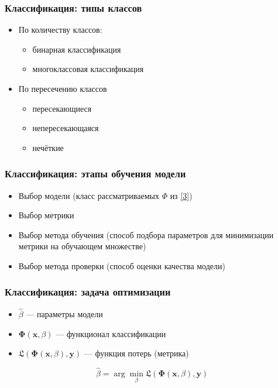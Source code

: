 \documentclass[11pt]{beamer}
\begin{document}
	\begin{frame}
		\frametitle{Классификация: типы классов}
		\begin{itemize}
			\item По количеству классов:
			\begin{itemize}
				\item бинарная классификация
				\item многоклассовая классификация
			\end{itemize}
			\item По пересечению классов 
			\begin{itemize}
				\item пересекающиеся
				\item непересекающаяся
				\item нечёткие
			\end{itemize}
		\end{itemize}
	\end{frame}

	\begin{frame}
		\frametitle{Классификация: этапы обучения модели}
		\begin{itemize}
			\item Выбор модели (класс рассматриваемых $\Phi$ из \ref{3})
			\item Выбор метрики
			\item Выбор метода обучения (способ подбора параметров для минимизации метрики на обучающем множестве)
			\item Выбор метода проверки (способ оценки качества модели)
		\end{itemize}
	\end{frame}

	\begin{frame}
		\frametitle{Классификация: задача оптимизации}
		\begin{itemize}
			\item $\hat{\beta}$ --- параметры модели
			\item $\bm{\Phi}(\bm{x}, \beta)$ --- функционал классификации
			\item $\mathfrak{L}(\bm{\Phi}(\bm{x}, \beta), \bm{y})$ --- функция потерь (метрика)
		\end{itemize}
		\begin{block}{}
			$$\hat{\beta} = \arg\min_{\beta} \mathfrak{L}(\bm{\Phi}(\bm{x}, \beta), \bm{y})$$
		\end{block}
	\end{frame}
\end{document}
